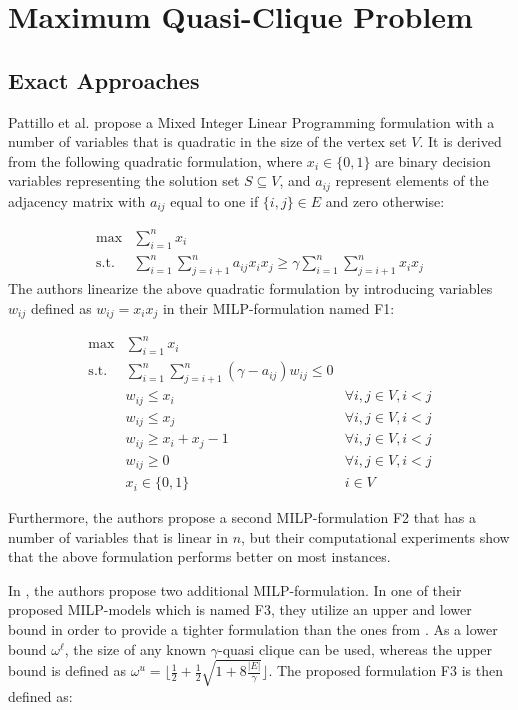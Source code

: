 \documentclass[draft,final]{vutinfth} %
\begin{document}
\section{Maximum Quasi-Clique Problem}\label{sec:mqcp-related-work}

\subsection{Exact Approaches}\label{milp-mqcp}
Pattillo et al. \cite{pattillo_maximum_2013} propose a Mixed Integer Linear Programming formulation with a number of variables that is quadratic in the size of the vertex set $V$. 
It is derived from the following quadratic formulation, where $x_i \in \{0,1\}$ are binary decision variables representing the solution set $S \subseteq V$, and $a_{ij}$ represent elements of the adjacency matrix with $a_{ij}$ equal to one if $\{i,j\} \in E$ and zero otherwise: 

\begin{align}
    \max & \sum_{i=1}^{n} x_i  \\
    \text{s.t. } & \sum_{i=1}^n \sum_{j=i+1}^n a_{ij} x_i x_j \geq \gamma \sum_{i=1}^n \sum_{j=i+1}^n x_i x_j 
\end{align}
The authors linearize the above quadratic formulation by introducing variables $w_{ij}$ defined as $w_{ij} = x_i x_j$ in their MILP-formulation named F1: 

\begin{align}
    \max & \sum_{i=1}^n x_i &\\
    \text{s.t. } & \sum_{i=1}^n \sum_{j=i+1}^n (\gamma - a_{ij}) w_{ij} \leq 0  &\\
     & w_{ij} \leq x_i & \forall i, j \in V, i < j\\
     & w_{ij} \leq x_j & \forall i, j \in V, i < j\\
     & w_{ij} \geq x_i + x_j - 1 & \forall i, j \in V, i < j\\
    & w_{ij} \geq 0 & \forall i, j \in V, i < j \\
    & x_i \in \{0,1\} & i \in V
\end{align}

Furthermore, the authors propose a second MILP-formulation F2 that has a number of variables that is linear in $n$, but their computational experiments show that the above formulation performs better on most instances. 

In \cite{VeremyevPBP16}, the authors propose two additional MILP-formulation. 
In one of their proposed MILP-models which is named F3, they utilize an upper and lower bound in order to provide a tighter formulation than the ones from \cite{pattillo_maximum_2013}. As a lower bound $\omega^{\ell}$, the size of any known $\gamma$-quasi clique can be used, whereas the upper bound is defined as  $\omega^u = \lfloor \frac{1}{2} + \frac{1}{2} \sqrt{1 + 8\frac{|E|}{\gamma}} \rfloor$. The proposed formulation F3 is then defined as: 
\end{document}
